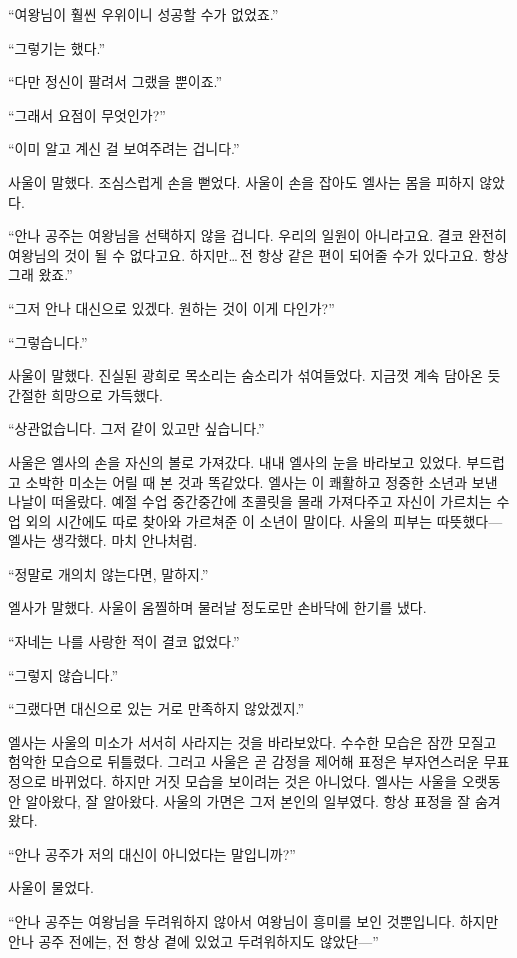 ``여왕님이 훨씬 우위이니 성공할 수가 없었죠.''

``그렇기는 했다.''

``다만 정신이 팔려서 그랬을 뿐이죠.''

``그래서 요점이 무엇인가?''

``이미 알고 계신 걸 보여주려는 겁니다.''

사울이 말했다. 조심스럽게 손을 뻗었다. 사울이 손을 잡아도 엘사는 몸을 피하지 않았다.

``안나 공주는 여왕님을 선택하지 않을 겁니다. 우리의 일원이 아니라고요. 결코 완전히 여왕님의 것이 될 수 없다고요. 하지만\ldots\,전 항상 같은 편이 되어줄 수가 있다고요. 항상 그래 왔죠.''

``그저 안나 대신으로 있겠다. 원하는 것이 이게 다인가?''

``그렇습니다.''

사울이 말했다. 진실된 광희로 목소리는 숨소리가 섞여들었다. 지금껏 계속 담아온 듯 간절한 희망으로 가득했다.

``상관없습니다. 그저 같이 있고만 싶습니다.''

사울은 엘사의 손을 자신의 볼로 가져갔다. 내내 엘사의 눈을 바라보고 있었다. 부드럽고 소박한 미소는 어릴 때 본 것과 똑같았다. 엘사는 이 쾌활하고 정중한 소년과 보낸 나날이 떠올랐다. 예절 수업 중간중간에 초콜릿을 몰래 가져다주고 자신이 가르치는 수업 외의 시간에도 따로 찾아와 가르쳐준 이 소년이 말이다. 사울의 피부는 따뜻했다—엘사는 생각했다. 마치 안나처럼.

 ``정말로 개의치 않는다면, 말하지.''

엘사가 말했다. 사울이 움찔하며 물러날 정도로만 손바닥에 한기를 냈다.

``자네는 나를 사랑한 적이 결코 없었다.''

``그렇지 않습니다.''

``그랬다면 대신으로 있는 거로 만족하지 않았겠지.''

엘사는 사울의 미소가 서서히 사라지는 것을 바라보았다. 수수한 모습은 잠깐 모질고 험악한 모습으로 뒤틀렸다. 그러고 사울은 곧 감정을 제어해 표정은 부자연스러운 무표정으로 바뀌었다. 하지만 거짓 모습을 보이려는 것은 아니었다. 엘사는 사울을 오랫동안 알아왔다, 잘 알아왔다. 사울의 가면은 그저 본인의 일부였다. 항상 표정을 잘 숨겨 왔다.

``안나 공주가 저의 대신이 아니었다는 말입니까?''

사울이 물었다.

``안나 공주는 여왕님을 두려워하지 않아서 여왕님이 흥미를 보인 것뿐입니다. 하지만 안나 공주 전에는, 전 항상 곁에 있었고 두려워하지도 않았단—''

